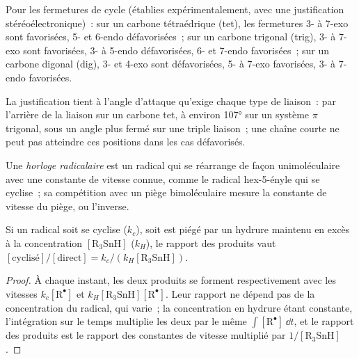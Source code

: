 \begin{proposition}\label{prop:b3:radicals-carbenes:baldwin}
Pour les fermetures de cycle (établies expérimentalement, avec une
justification stéréoélectronique)~: sur un carbone tétraédrique (tet), les
fermetures 3- à 7-exo sont favorisées, 5- et 6-endo défavorisées~; sur un
carbone trigonal (trig), 3- à 7-exo sont favorisées, 3- à 5-endo
défavorisées, 6- et 7-endo favorisées~; sur un carbone digonal (dig), 3- et
4-exo sont défavorisées, 5- à 7-exo favorisées, 3- à 7-endo favorisées.
\end{proposition}

La justification tient à l'angle d'attaque qu'exige chaque type de
liaison~: par l'arrière de la liaison sur un carbone tet, à environ 107° sur
un système $\pi$ trigonal, sous un angle plus fermé sur une triple liaison~; une
chaîne courte ne peut pas atteindre ces positions dans les cas
défavorisés.

\begin{definition}\label{def:b3:radicals-carbenes:radical-clock}
Une \emph{horloge radicalaire} est un radical
qui se réarrange de façon unimoléculaire avec une constante de vitesse
connue, comme le radical hex-5-ényle qui se cyclise~; sa compétition avec un
piège bimoléculaire mesure la constante de vitesse du piège, ou
l'inverse.
\end{definition}

\begin{proposition}\label{prop:b3:radicals-carbenes:clock}
Si un radical soit se cyclise ($k_c$), soit est piégé par un hydrure maintenu en excès à la
concentration $[\mathrm{R_3SnH}]$ ($k_H$), le rapport des produits vaut
$[\text{cyclisé}]/[\text{direct}] = k_c/(k_H[\mathrm{R_3SnH}])$.
\end{proposition}

\begin{proof}
À chaque instant, les deux produits se forment respectivement avec les vitesses $k_c[\mathrm R^\bullet]$ et $k_H[\mathrm{R_3SnH}][\mathrm R^\bullet]$. Leur rapport
ne dépend pas de la concentration du radical, qui varie~; la concentration
en hydrure étant constante, l'intégration sur le temps multiplie les deux par le même
$\int[\mathrm R^\bullet]\,\dd t$, et le rapport des produits est le rapport des constantes de vitesse
multiplié par $1/[\mathrm{R_3SnH}]$.
\end{proof}


